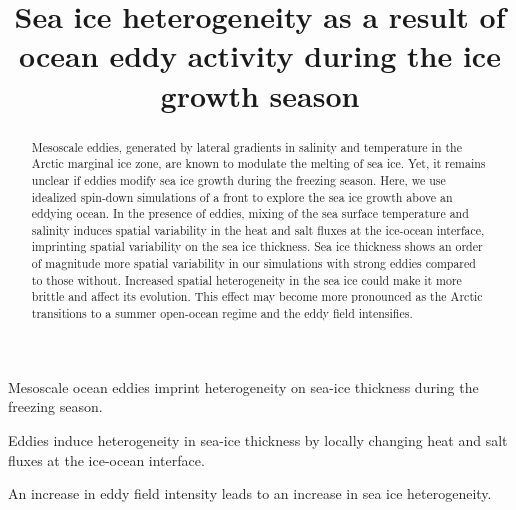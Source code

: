\documentclass[draft]{agujournal2019}
\begin{document}
%
%

\title{Sea ice heterogeneity as a result of ocean eddy activity during the ice growth season}

%
%





\begin{keypoints}
\item Mesoscale ocean eddies imprint heterogeneity on sea-ice thickness during the freezing season.
\item Eddies induce heterogeneity in sea-ice thickness by locally changing heat and salt fluxes at the ice-ocean interface. 
\item An increase in eddy field intensity leads to an increase in sea ice heterogeneity.
\end{keypoints}


\begin{abstract}
    Mesoscale eddies, generated by lateral gradients in salinity and temperature in the Arctic marginal ice zone, are known to modulate the melting of sea ice. Yet, it remains unclear if eddies modify sea ice growth during the freezing season. Here, we use idealized spin-down simulations of a front to explore the sea ice growth above an eddying ocean. In the presence of eddies, mixing of the sea surface temperature and salinity induces spatial variability in the heat and salt fluxes at the ice-ocean interface, imprinting spatial variability on the sea ice thickness. Sea ice thickness shows an order of magnitude more spatial variability in our simulations with strong eddies compared to those without. Increased spatial heterogeneity in the sea ice could make it more brittle and affect its evolution. This effect may become more pronounced as the Arctic transitions to a summer open-ocean regime and the eddy field intensifies.
\end{abstract}
\end{document}
